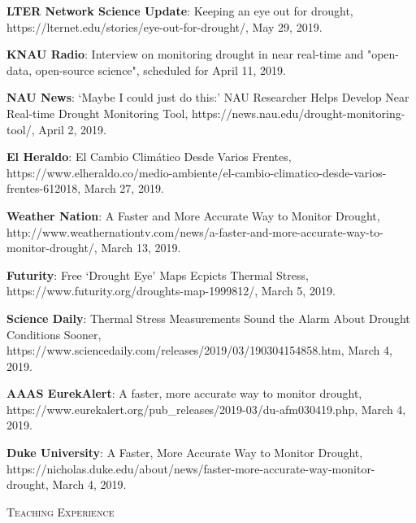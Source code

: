 \documentclass[10pt]{article}
\newenvironment{changemargin}[2]{%
  \begin{list}{}{%
 \setlength{\topsep}{0pt}%
 \setlength{\leftmargin}{#1}%
 \setlength{\rightmargin}{#2}%
 \setlength{\listparindent}{\parindent}%
 \setlength{\itemindent}{\parindent}%
 \setlength{\parsep}{\parskip}%
  }%
  \item[]}{\end{list}
}
\newcommand{\lineover}{
  \begin{changemargin}{-0.05in}{-0.05in}
  \vspace*{-8pt}
  \hrulefill \\
  \vspace*{-2pt}
  \end{changemargin}
}
\newcommand{\header}[1]{
  \begin{changemargin}{-0.5in}{-0.5in}
  \scshape{#1}\\
  \lineover
  \end{changemargin}
}
\newenvironment{body} {
  \vspace*{-2pt}
  \begin{changemargin}{-0.5in}{-0.5in}
}
{\end{changemargin}
}
\begin{document}
\begin{body}

  \textbf{LTER Network Science Update}: Keeping an eye out for drought, https://lternet.edu/stories/eye-out-for-drought/, May 29, 2019.\\
  \medskip

  \textbf{KNAU Radio}: Interview on monitoring drought in near real-time and "open-data, open-source science", scheduled for April 11, 2019.\\
  \medskip

  \textbf{NAU News}: ‘Maybe I could just do this:’ NAU Researcher Helps Develop Near Real-time Drought Monitoring Tool, https://news.nau.edu/drought-monitoring-tool/, April 2, 2019.\\
  \medskip

  \textbf{El Heraldo}: El Cambio Climático Desde Varios Frentes, https://www.elheraldo.co/medio-ambiente/el-cambio-climatico-desde-varios-frentes-612018, March 27, 2019.\\ \medskip

  \textbf{Weather Nation}: A Faster and More Accurate Way to Monitor Drought, http://www.weathernationtv.com/news/a-faster-and-more-accurate-way-to-monitor-drought/, March 13, 2019.\\
  \medskip

  \textbf{Futurity}: Free ‘Drought Eye’ Maps Ecpicts Thermal Stress, https://www.futurity.org/droughts-map-1999812/, March 5, 2019.\\
  \medskip

  \textbf{Science Daily}: Thermal Stress Measurements Sound the Alarm About Drought Conditions Sooner, https://www.sciencedaily.com/releases/2019/03/190304154858.htm, March 4, 2019.\\
  \medskip

  \textbf{AAAS EurekAlert}: A faster, more accurate way to monitor drought, https://www.eurekalert.org/pub\_releases/2019-03/du-afm030419.php, March 4, 2019.\\
  \medskip

  \textbf{Duke University}: A Faster, More Accurate Way to Monitor Drought, https://nicholas.duke.edu/about/news/faster-more-accurate-way-monitor-drought, March 4, 2019.\\
  \medskip

\end{body}

\medskip


\header{Teaching Experience}
\end{document}
